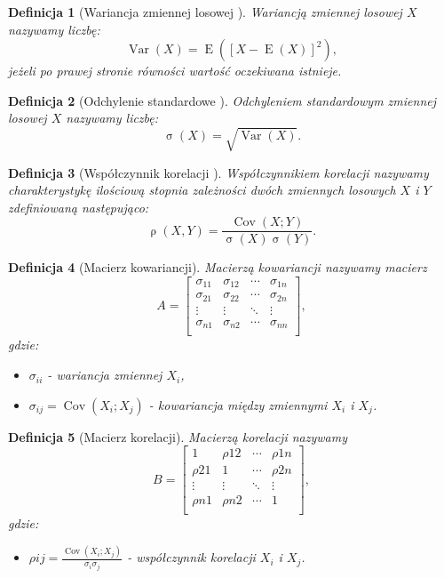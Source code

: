 \documentclass[12pt,a4paper]{report}
\newtheorem{df}{Definicja}[chapter]
\newcommand{\ro}[2]{\operatorname{\rho}\left( {#1},{#2} \right)}
\newcommand{\Covariance}[2]{\operatorname{Cov}\left({#1}; {#2} \right)}
\newcommand{\variance}[1]{\operatorname{Var}\left({#1} \right)}
\newcommand{\e}[1]{\operatorname{E}\left({#1} \right)}
\newcommand{\standard}[1]{\operatorname{\sigma}\left({#1} \right)}
\begin{document}
\begin{df}[Wariancja zmiennej losowej {\citep[Sec 2.8 Def.2.28]{wztp}}]
Wariancją zmiennej losowej $X$ nazywamy liczbę:
$$
\variance{X}=\e{[X-\e{X}]^2},
$$
jeżeli po prawej stronie równości wartość oczekiwana istnieje.
\end{df} 
\begin{df}[Odchylenie standardowe {\citep[Sec 2.8 Def.2.28]{wztp}}]
Odchyleniem standardowym zmiennej losowej $X$ nazywamy liczbę:
$$
\standard{X}=\sqrt{\variance{X}}.
$$
\end{df}
\begin{df}[Współczynnik korelacji {\citep{wztp}}]
Współczynnikiem korelacji nazywamy charakterystykę ilościową stopnia zależności dwóch zmiennych losowych $X$ i $Y$ zdefiniowaną następująco:
$$
\ro{X}{Y} = \frac{\Covariance{X}{Y}}{\standard{X} \standard{Y}}.
$$
\end{df}
\begin{df}[Macierz kowariancji]
Macierzą kowariancji nazywamy macierz 
$$
A= \left[
        \begin{array}{cccc}
         \sigma_{11} & \sigma_{12} & \cdots & \sigma_{1n} \\
         \sigma_{21} & \sigma_{22} & \cdots & \sigma_{2n} \\
         \vdots & \vdots & \ddots & \vdots \\
         \sigma_{n1} & \sigma_{n2} & \cdots & \sigma_{nn}\\
         \end{array}
      \right], 
$$
gdzie:
\begin{itemize}
\item $\sigma_{ii}$ - wariancja zmiennej $X_i$,
\item $\sigma_{ij}=\Covariance{X_i}{X_j}$ - kowariancja między zmiennymi $X_i$ i $X_j$.
\end{itemize}
\end{df}
\begin{df}[Macierz korelacji]
Macierzą korelacji nazywamy
$$
B= \left[
        \begin{array}{cccc}
         1 & \rho{12} & \cdots & \rho{1n} \\
         \rho{21} & 1 & \cdots & \rho{2n} \\
         \vdots & \vdots & \ddots & \vdots \\ 
         \rho{n1} & \rho{n2} & \cdots & 1 \\ 
         \end{array}
      \right], 
$$
gdzie:
\begin{itemize}
\item $\rho{ij}=\frac{\Covariance{X_i}{X_j}}{\sigma_{i}\sigma_{j}}$ - współczynnik korelacji $X_i$ i $X_j$.
\end{itemize}
\end{df}
\end{document}
